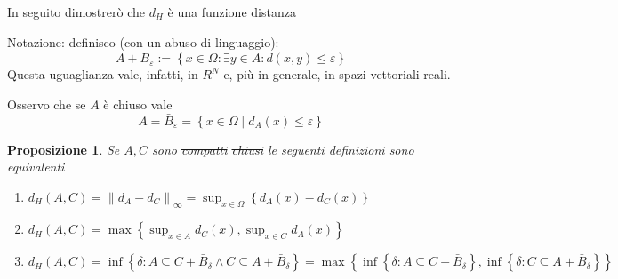 \documentclass[a4paper,10pt]{article}
\newcounter{counter1}
\theoremstyle{plain}
\newtheorem{mypro}[counter1]{Proposizione}
\theoremstyle{definition}
\theoremstyle{remark}
\newcommand{\set}[1]{\left\{#1\right\}}
\newcommand{\norm}[1]{\left\|#1\right\|}
\begin{document}
In seguito dimostrerò che $d_H$ è una funzione distanza

Notazione: definisco (con un abuso di linguaggio):
\[ A + \bar B_\varepsilon := \set{ x \in \Omega : \exists y \in A :
  d(x,y) \le \varepsilon }\]
Questa uguaglianza vale, infatti, in $R^N$ e, più in generale, in
spazi vettoriali reali.

Osservo che se $A$ è chiuso vale
\[ A = \bar B _{\varepsilon} = \set{ x \in \Omega \mid d_A(x) \le
  \varepsilon} \] 


\begin{mypro}
  Se $A, C$ sono \sout{compatti} \sout{chiusi} le seguenti definizioni
  sono equivalenti
  \begin{enumerate}
  \item $ d_H (A,C) = \norm{ d_A - d_C } _\infty = \sup _{x\in \Omega}
    \set {d_A(x) - d_C(x)}$
  \item $d_H(A,C) = \max \set{\sup _{x\in A} d_C (x) , \sup _{x\in C}
      d_A (x) }$
  \item $d_H (A,C) = \inf \set{\delta : A \subseteq C + \bar B
    _\delta \wedge C \subseteq A + \bar B_\delta} = \max \set{\inf
    \set{\delta : A \subseteq C + \bar B _\delta }, \inf \set{\delta : C
      \subseteq A + \bar B _\delta }}  $
  \end{enumerate}
\end{mypro}
\end{document}
